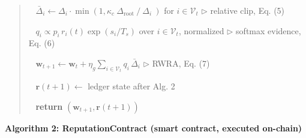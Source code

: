 \documentclass[cmc,article,submit,moreauthors,pdftex]{Definitions/tsp}
\begin{document}
\begin{quote}
\noindent{}~ $\bar{\Delta}_i \leftarrow \Delta_i \cdot \min(1, \kappa_c\ \Delta_{\mathrm{root}}\ / \ \Delta_i\ )$ for $i \in \mathcal{V}_t$  $\triangleright$ relative clip, Eq. (5)

\noindent{}~ $q_i \propto p_i \, r_i(t) \exp(s_i / T_s)$ over $i \in \mathcal{V}_t$, normalized  $\triangleright$ softmax evidence, Eq. (6)

\noindent{}~ $\mathbf{w}_{t+1} \leftarrow \mathbf{w}_t + \eta_g \sum_{i \in \mathcal{V}_t} q_i \, \bar{\Delta}_i$  $\triangleright$ RWRA, Eq. (7)

\noindent{}~ $\mathbf{r}(t+1) \leftarrow$ ledger state after Alg. 2

\noindent{}~ \textbf{return} $(\mathbf{w}_{t+1}, \mathbf{r}(t+1))$
\end{quote}

\vspace{0.5em}

\noindent\textbf{Algorithm 2: ReputationContract (smart contract, executed on-chain)}
\end{document}

